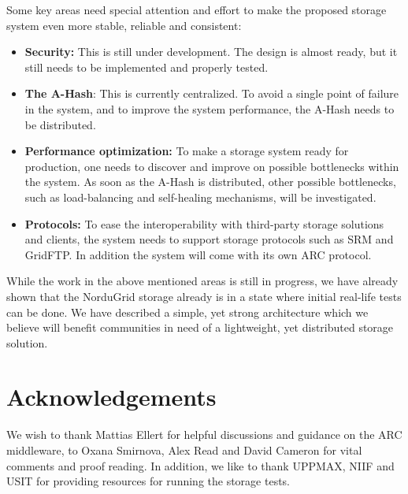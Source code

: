 \documentclass[final]{ieee}
\begin{document}
Some key areas need special attention and effort to make the proposed
storage system even more stable, reliable and consistent:
\begin{itemize}
\item \textbf{Security:} This is still under development. The design
  is almost ready, but it still needs to be implemented and properly
  tested.
\item \textbf{The A-Hash}: This is currently centralized. To avoid a single
  point of failure in the system, and to improve the system
  performance, the A-Hash needs to be distributed.
\item \textbf{Performance optimization:} To make a storage system
  ready for production, one needs to discover and improve on
  possible bottlenecks within the system. As soon as the A-Hash is
  distributed, other possible bottlenecks, such as load-balancing
  and self-healing mechanisms, will be investigated.
\item \textbf{Protocols:} To ease the interoperability with third-party
  storage solutions and clients, the system needs to support storage
  protocols such as SRM and GridFTP. In addition the system will come
  with its own ARC protocol.
\end{itemize}

While the work in the above mentioned areas is still in progress, we have 
already shown that the NorduGrid storage already is in a state where initial 
real-life tests can be done. We have described a simple, yet strong 
architecture which we believe will benefit communities in need of a lightweight, 
yet distributed storage solution.

\section{Acknowledgements}
\label{Acknowledgements}

We wish to thank Mattias Ellert for helpful discussions and guidance
on the ARC middleware, to Oxana Smirnova, Alex Read and David Cameron 
for vital comments and proof reading. In addition, we like to thank UPPMAX, NIIF and USIT for
providing resources for running the storage tests.
\end{document}
